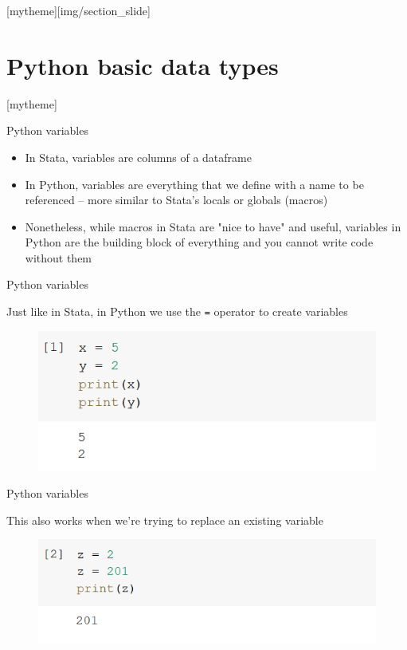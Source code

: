 \documentclass[aspectratio=169]{beamer}
\newcommand{\sectionpic}[2]{
	\setbeamertemplate{section page}[mytheme][#2]
	\section{#1}
	\setbeamertemplate{section page}[mytheme]
}
\begin{document}
\sectionpic{Python basic data types}{img/section_slide}

\begin{frame}{Python variables}

	\begin{itemize}
		\item In Stata, variables are columns of a dataframe
		\item In Python, variables are everything that we define with a name to be referenced -- more similar to Stata's locals or globals (macros)
		\item Nonetheless, while macros in Stata are "nice to have" and useful, variables in Python are the building block of everything and you cannot write code without them
	\end{itemize}

\end{frame}

\begin{frame}{Python variables}

	Just like in Stata, in Python we use the \texttt{=} operator to create variables

	\begin{figure}
		\centering
		\includegraphics[width=0.6\linewidth]{img/assignation.png}
	\end{figure}

\end{frame}

\begin{frame}{Python variables}

	This also works when we're trying to replace an existing variable

	\begin{figure}
		\centering
		\includegraphics[width=0.6\linewidth]{img/replace.png}
	\end{figure}

\end{frame}
\end{document}
